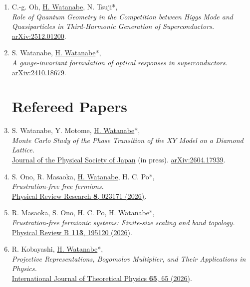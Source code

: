 \documentclass[letterpaper,11pt]{article}
\begin{document}
\begin{enumerate}
\item C.-g. Oh, \underline{H. Watanabe}, N. Tsuji*, \\\emph{Role of Quantum Geometry in the Competition between Higgs Mode and Quasiparticles in Third-Harmonic Generation of Superconductors.}\\{\href{https://arxiv.org/abs/2512.01200}{arXiv:2512.01200}.}

\item S. Watanabe, \underline{H. Watanabe}*, \\\emph{A gauge-invariant formulation of optical responses in superconductors.}\\{\href{https://arxiv.org/abs/2410.18679}{arXiv:2410.18679}.}

\clearpage


\setcounter{enumi}{0}
\section*{Refereed Papers}

\item S. Watanabe, Y. Motome, \underline{H. Watanabe}*, \\\emph{Monte Carlo Study of the Phase Transition of the $XY$ Model on a Diamond Lattice.}\\{\href{https://doi.org/10.7566/JPSJ}{Journal of the Physical Society of Japan} (in press). \href{https://arxiv.org/abs/2604.17939}{arXiv:2604.17939}.}

\item S. Ono, R. Masaoka, \underline{H. Watanabe}, H. C. Po*, \\\emph{Frustration-free free fermions.}\\{\href{https://doi.org/10.1103/9mt9-9fjr}{Physical Review Research {\bf 8}, 023171 (2026)}.}

\item R. Masaoka, S. Ono, H. C. Po, \underline{H. Watanabe}*, \\\emph{Frustration-free fermionic systems: Finite-size scaling and band topology.}\\{\href{https://doi.org/10.1103/qv6d-dk21}{Physical Review B {\bf 113}, 195120 (2026)}.}

\item R. Kobayashi, \underline{H. Watanabe}*, \\\emph{Projective Representations, Bogomolov Multiplier, and Their Applications in Physics.}\\{\href{https://doi.org/10.1007/s10773-025-06215-y}{International Journal of Theoretical Physics {\bf 65}, 65 (2026)}.}


\end{enumerate}
\end{document}
